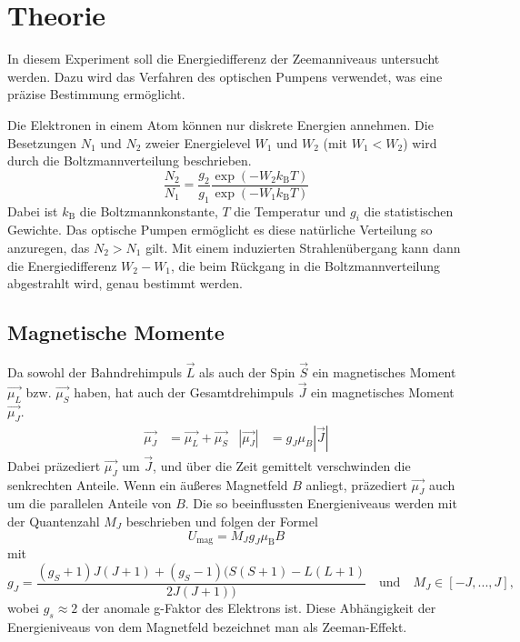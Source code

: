 \section{Theorie}
\label{sec:Theorie}
In diesem Experiment soll die Energiedifferenz der Zeemanniveaus untersucht werden. Dazu wird das Verfahren des optischen Pumpens verwendet, was eine präzise Bestimmung ermöglicht.

Die Elektronen in einem Atom können nur diskrete Energien annehmen. Die Besetzungen $N_1$ und $N_2$  zweier Energielevel $W_1$ und $W_2$ (mit $W_1<W_2$) wird durch die Boltzmannverteilung beschrieben.
\begin{equation}
	\frac{N_2}{N_1}=\frac{g_2}{g_1}\frac{\exp(-W_2k_\text{B}T)}{\exp(-W_1k_\text{B}T)}
	\label{eqn:Boltzmann}
\end{equation}
Dabei ist $k_\text{B}$ die Boltzmannkonstante, $T$ die Temperatur und $g_i$ die statistischen Gewichte. Das optische Pumpen ermöglicht es diese natürliche Verteilung so anzuregen, das $N_2 > N_1$ gilt. Mit einem induzierten Strahlenübergang kann dann die Energiedifferenz $W_2-W_1$, die beim Rückgang in die Boltzmannverteilung abgestrahlt wird, genau bestimmt werden.
\subsection{Magnetische Momente}
Da sowohl der Bahndrehimpuls $\vec{L}$ als auch der Spin $\vec{S}$ ein magnetisches Moment $\vec{\mu_L}$ bzw. $\vec{\mu_S}$ haben, hat auch der Gesamtdrehimpuls  $\vec{J}$ ein magnetisches Moment $\vec{\mu_J}$.
\begin{align}
	\vec{\mu_J}&=\vec{\mu_L} +\vec{\mu_S} & \left| \vec{\mu_J} \right|&=g_J\mu_B\left| \vec{J} \right|
\end{align}
Dabei präzediert $\vec{\mu_J}$ um $\vec{J}$, und über die Zeit gemittelt verschwinden die senkrechten Anteile.
Wenn ein äußeres Magnetfeld $B$ anliegt, präzediert $\vec{\mu_J}$ auch um die parallelen Anteile von $B$. Die so beeinflussten Energieniveaus werden mit der Quantenzahl $M_J$ beschrieben und folgen der Formel
\begin{equation}
	U_\text{mag} = M_J g_J \mu_\text{B}B
	\label{ABC}
\end{equation}
mit
\begin{equation}
	g_J = \frac{(g_S+1)J(J+1)+(g_S-1)(S(S+1)-L(L+1)}{2J(J+1))} \quad \text{und}\quad M_J \in [-J,...,J],
	\label{GHI}
\end{equation}
wobei $g_s \approx 2$ der anomale g-Faktor des Elektrons ist. Diese Abhängigkeit der Energieniveaus von dem Magnetfeld bezeichnet man als Zeeman-Effekt.
